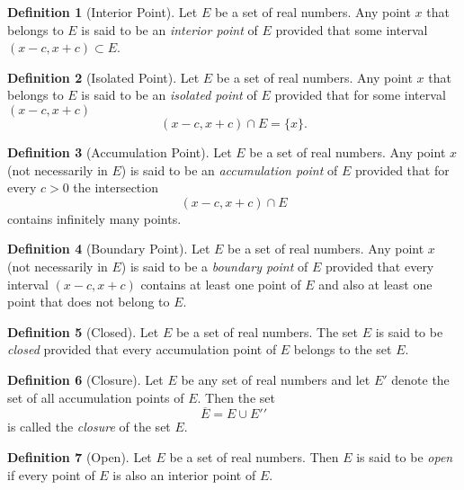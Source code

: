 \documentclass[11pt]{article}
\newcommand{\set}[1]{\{#1\}}
\theoremstyle{definition}
\newtheorem{definition}{Definition}[section]
\begin{document}
\begin{definition} [Interior Point]
	Let $ E $ be a set of real numbers. Any point $ x $ that belongs to $ E $ is said to be an \textit{interior point} of $ E $ provided that some interval $ (x - c, x + c) \subset E $.
\end{definition}

\setcounter{definition}{2}
\begin{definition} [Isolated Point]
	Let $ E $ be a set of real numbers. Any point $ x $ that belongs to $ E $ is said to be an \textit{isolated point} of $ E $ provided that for some interval $(x - c, x + c)$
		$$(x - c, x + c) \cap E = \set{x}.$$
\end{definition}

\setcounter{definition}{4}
\begin{definition} [Accumulation Point]
	Let $ E $ be a set of real numbers. Any point $ x $ (not necessarily in	$ E $) is said to be an \textit{accumulation point} of $ E $ provided that for every $ c > 0 $ the intersection
		$$ (x - c, x + c) \cap E $$
	contains infinitely many points.
\end{definition}

\setcounter{definition}{6}
\begin{definition} [Boundary Point]
	Let $ E $ be a set of real numbers. Any point $ x $ (not necessarily in $ E $) is said to be a \textit{boundary point} of $ E $ provided that every interval $ (x - c, x + c) $ contains at least one point of $ E $ and also at least one point that does not belong to $ E $.
\end{definition}

\setcounter{definition}{8}
\begin{definition} [Closed]
	Let $ E $ be a set of real numbers. The set $ E $ is said to be \textit{closed} provided that every accumulation point of $ E $ belongs to the set $ E $.
\end{definition}

\setcounter{definition}{10}
\begin{definition} [Closure]
	Let $ E $ be any set of real numbers and let $ E′ $ denote the set of all accumulation points of $ E $. Then the set
		$$ \overline{E} = E \cup E′'$$
	is called the \textit{closure} of the set $ E $.
\end{definition}


\begin{definition} [Open]
	Let $ E $ be a set of real numbers. Then $ E $ is said to be \textit{open} if every point of $ E $
	is also an interior point of $ E $.
\end{definition}
\end{document}
